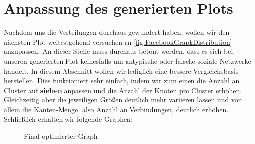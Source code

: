 \section{Anpassung des generierten Plots}
Nachdem uns die Verteilungen durchaus gewundert haben, wollen wir den nächsten Plot weitestgehend versuchen an \ref{fig:FacebookGraphDistribution} anzupassen. An dieser Stelle muss durchaus betont werden, dass es sich bei unseren generierten Plot keinesfalls um untypische oder falsche soziale Netzwerke handelt. In diesem Abschnitt wollen wir lediglich eine bessere Vergleichsbasis herstellen. Dies funktioniert sehr einfach, indem wir zum einen die Anzahl an Cluster auf \textbf{sieben} anpassen und die Anzahl der Knoten pro Cluster erhöhen. Gleichzeitig aber die jeweiligen Größen deutlich mehr variieren lassen und vor allem die Kanten-Menge, also Anzahl an Verbindungen, deutlich erhöhen. Schließlich erhalten wir folgende Graphen: 

\FloatBarrier
\begin{figure}[h!]%
  \centering
  \qquad
  \caption{Final optimierter Graph}
  \label{fig:ourGraphFinalPlot}
\end{figure}
\FloatBarrier

